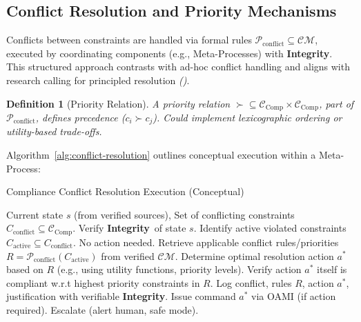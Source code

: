 \documentclass[12pt,a4paper]{report}
\renewcommand{\citep}[1]{\textit{\scriptsize{(\cite{#1})}}}
\newtheorem{definition}{Definition}[section]
\newcommand{\Integrity}{\textbf{Integrity}}
\begin{document}
	\subsection{Conflict Resolution and Priority Mechanisms} %
	\label{sec:5-2-3} %
	
	Conflicts between constraints are handled via formal rules $\mathcal{P}_{\text{conflict}} \subseteq \mathcal{CM}$, executed by coordinating components (e.g., Meta-Processes) with \Integrity. This structured approach contrasts with ad-hoc conflict handling and aligns with research calling for principled resolution \citep{Sekrst2024Guardrails}.
	
	\begin{definition}[Priority Relation]
		\label{def:priority_relation}
		A priority relation $\succ \subseteq \mathcal{C}_{\text{Comp}} \times \mathcal{C}_{\text{Comp}}$, part of $\mathcal{P}_{\text{conflict}}$, defines precedence ($c_i \succ c_j$). Could implement lexicographic ordering or utility-based trade-offs.
	\end{definition}
	
	Algorithm~\ref{alg:conflict-resolution} outlines conceptual execution within a Meta-Process:
	
	\begin{algorithm}[H]
		\caption{Compliance Conflict Resolution Execution (Conceptual)}
		\label{alg:conflict-resolution}
		\begin{algorithmic}[1]
			\Require Current state $s$ (from verified sources), Set of conflicting constraints $C_{\text{conflict}} \subseteq \mathcal{C}_{\text{Comp}}$.
			\State Verify \Integrity\ of state $s$.
			\State Identify active violated constraints $C_{\text{active}} \subseteq C_{\text{conflict}}$.
			 \State No action needed. \EndIf
			\State Retrieve applicable conflict rules/priorities $R = \mathcal{P}_{\text{conflict}}(C_{\text{active}})$ from verified $\mathcal{CM}$.
			\State Determine optimal resolution action $a^*$ based on $R$ (e.g., using utility functions, priority levels).
			\State Verify action $a^*$ itself is compliant w.r.t highest priority constraints in $R$.
			\State Log conflict, rules $R$, action $a^*$, justification with verifiable \Integrity.
			\State Issue command $a^*$ via OAMI (if action required).
			 \State Escalate (alert human, safe mode). \EndIf
		\end{algorithmic}
	\end{algorithm}
	
\end{document}
